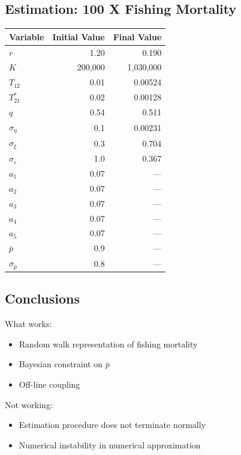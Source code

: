 \documentclass[a4paper,KOMA,landscape,titlepage]{powersem}
\begin{document}
\begin{slide}\section{Estimation: 100 X Fishing Mortality}
{\renewcommand{\arraystretch}{0.8}
\begin{center}
\begin{tabular}{lrr}
\hline
Variable & Initial Value & Final Value\\
\hline
$r$ & 1.20&  0.190\\
$K$ & 200,000 & 1,030,000 \\
$T_{12}$ & 0.01 & 0.00524\\
$T^*_{21}$& 0.02 & 0.00128\\
$q$ & 0.54 & 0.511\\
\hline
$\sigma_\eta$ & 0.1 & 0.00231\\
$\sigma_\xi$ & 0.3 & 0.704\\
$\sigma_\varepsilon$ & 1.0 & 0.367\\
$a_1$ & 0.07 & ---\\
$a_2$ & 0.07 & ---\\
$a_3$ & 0.07 & ---\\
$a_4$ & 0.07 & ---\\
$a_5$ & 0.07 & ---\\
\hline
$\bar{p}$ & 0.9 & ---\\
$\sigma_{\bar{p}}$ & 0.8 & ---\\
\hline
\end{tabular}
\end{center}
}
\end{slide}

\begin{slide}\section{Conclusions}
What works:
\begin{itemize}
\item Random walk representation of fishing mortality
\item Bayesian constraint on $\bar{p}$
\item Off-line coupling 
\end{itemize}
Not working:
\begin{itemize}
\item Estimation procedure does not terminate normally
\item Numerical instability in numerical approximation
\end{itemize}
\end{slide}
\end{document}
